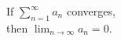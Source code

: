 \documentclass[border=6pt]{standalone}
\begin{document}
\parbox{1.5in}{If $\displaystyle\sum_{n=1}^\infty a_n$ converges, \\
then $\displaystyle\lim_{n\to\infty} a_n = 0$.}
\end{document}

